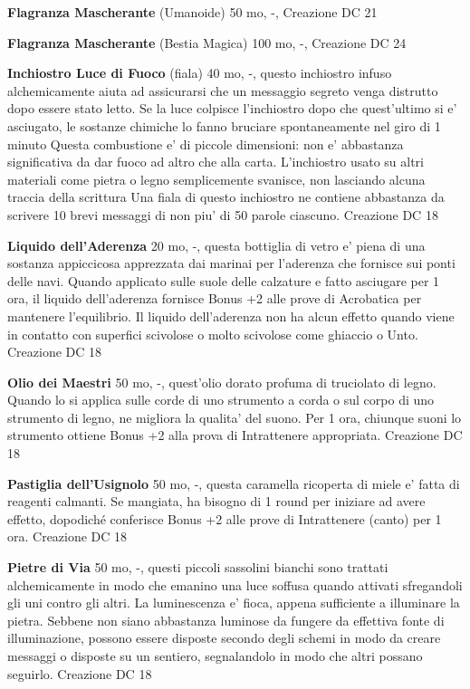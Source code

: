 \documentclass[a4paper,11pt,twoside,openany]{book}
\begin{document}
{\textbf{Flagranza Mascherante} (Umanoide) 50 mo, -, Creazione DC 21

\textbf{Flagranza Mascherante} (Bestia Magica) 100 mo, -, Creazione DC 24

\textbf{Inchiostro Luce di Fuoco} (fiala) 40 mo, -, questo inchiostro infuso alchemicamente aiuta ad assicurarsi che un messaggio segreto venga distrutto dopo essere stato letto. Se la luce colpisce l'inchiostro dopo che quest'ultimo si e' asciugato, le sostanze chimiche lo fanno bruciare spontaneamente nel giro di 1 minuto
Questa combustione e' di piccole dimensioni: non e' abbastanza significativa da dar fuoco ad altro che alla carta. L'inchiostro usato su altri materiali come pietra o legno semplicemente svanisce, non lasciando alcuna traccia della scrittura
 Una fiala di questo inchiostro ne contiene abbastanza da scrivere 10 brevi messaggi di non piu' di 50 parole ciascuno. Creazione DC 18

\textbf{Liquido dell'Aderenza} 20 mo, -, questa bottiglia di vetro e' piena di una sostanza appiccicosa apprezzata dai marinai per l'aderenza che fornisce sui ponti delle navi. Quando applicato sulle suole delle calzature e fatto asciugare per 1 ora, il liquido dell'aderenza fornisce Bonus +2 alle prove di Acrobatica per mantenere l'equilibrio.
Il liquido dell'aderenza non ha alcun effetto quando viene in contatto con superfici scivolose o molto scivolose come ghiaccio o Unto. Creazione DC 18

\textbf{Olio dei Maestri} 50 mo, -, quest'olio dorato profuma di truciolato di legno. Quando lo si applica sulle corde di uno strumento a corda o sul corpo di uno strumento di legno, ne migliora la qualita' del suono. Per 1 ora, chiunque suoni lo strumento ottiene Bonus +2 alla prova di Intrattenere appropriata. Creazione DC 18

\textbf{Pastiglia dell'Usignolo} 50 mo, -, questa caramella ricoperta di miele e' fatta di reagenti calmanti. Se mangiata, ha bisogno di 1 round per iniziare ad avere effetto, dopodiché conferisce Bonus +2 alle prove di Intrattenere (canto) per 1 ora. Creazione DC 18

\textbf{Pietre di Via} 50 mo, -, questi piccoli sassolini bianchi sono trattati alchemicamente in modo che emanino una luce soffusa quando attivati sfregandoli gli uni contro gli altri. La luminescenza e' fioca, appena sufficiente a illuminare la pietra.
Sebbene non siano abbastanza luminose da fungere da effettiva fonte di illuminazione, possono essere disposte secondo degli schemi in modo da creare messaggi o disposte su un sentiero, segnalandolo in modo che altri possano seguirlo. Creazione DC 18

}
\end{document}
